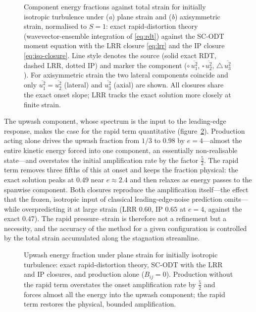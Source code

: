 \documentclass[11pt,a4paper]{article}
\begin{document}
\begin{figure}
  \centering
  \caption{Component energy fractions against total strain for initially
  isotropic turbulence under (\textit{a}) plane strain and (\textit{b})
  axisymmetric strain, normalised to $S=1$: exact rapid-distortion
  theory (wavevector-ensemble integration of \eqref{eq:rdt}) against the
  SC-ODT moment equation with the LRR closure \eqref{eq:lrr} and the IP
  closure \eqref{eq:iso-closure}. Line style denotes the source (solid
  exact RDT, dashed LRR, dotted IP) and marker the component
  ($\circ\,\overline{u_1^2}$, $\square\,\overline{u_2^2}$,
  $\triangle\,\overline{u_3^2}$). For axisymmetric strain the two
  lateral components coincide and only
  $\overline{u_1^2}=\overline{u_2^2}$ (lateral) and $\overline{u_3^2}$
  (axial) are shown. All closures share the exact onset slope; LRR
  tracks the exact solution more closely at finite strain.}
  \label{fig:rdt-components}
\end{figure}

The upwash component, whose spectrum is the input to the leading-edge
response, makes the case for the rapid term quantitative
(figure~\ref{fig:rdt-upwash}). Production acting alone drives the upwash
fraction from $1/3$ to $0.98$ by $e=4$---almost the entire kinetic
energy forced into one component, an essentially non-realisable
state---and overstates the initial amplification rate by the factor
$\tfrac52$. The rapid term removes three fifths of this at onset and
keeps the fraction physical: the exact solution peaks at $0.49$ near
$e\approx2.4$ and then relaxes as energy passes to the spanwise
component. Both closures reproduce the amplification itself---the effect
that the frozen, isotropic input of classical leading-edge-noise
prediction omits---while overpredicting it at large strain (LRR $0.60$,
IP $0.65$ at $e=4$, against the exact $0.47$). The rapid
pressure--strain is therefore not a refinement but a necessity, and the
accuracy of the method for a given configuration is controlled by the
total strain accumulated along the stagnation streamline.

\begin{figure}
  \centering
  \caption{Upwash energy fraction under plane strain for initially
  isotropic turbulence: exact rapid-distortion theory, SC-ODT with
  the LRR and IP closures, and production alone ($B_{ij}=0$). Production
  without the rapid term overstates the onset amplification rate by
  $\tfrac52$ and forces almost all the energy into the upwash component;
  the rapid term restores the physical, bounded amplification.}
  \label{fig:rdt-upwash}
\end{figure}
\end{document}
